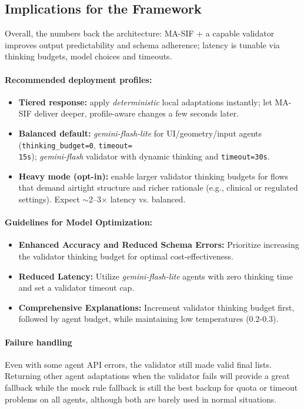 \documentclass[openany]{book}
\begin{document}
\subsection*{Implications for the Framework}
Overall, the numbers back the architecture: MA-SIF + a capable validator improves output predictability and schema adherence; latency is tunable via thinking budgets, model choices and timeouts.

\paragraph{Recommended deployment profiles:}
\begin{itemize}
    \item \textbf{Tiered response:} apply \emph{deterministic} local adaptations instantly; let MA-SIF deliver deeper, profile-aware changes a few seconds later.
    \item \textbf{Balanced default:} \emph{gemini-flash-lite} for UI/geometry/input agents (\texttt{thinking\_budget=0}, \texttt{timeout=\\15s}); \emph{gemini-flash} validator with dynamic thinking and \texttt{timeout=30s}.
    \item \textbf{Heavy mode (opt-in):} enable larger validator thinking budgets for flows that demand airtight structure and richer rationale (e.g., clinical or regulated settings). Expect $\sim$2–3$\times$ latency vs. balanced.
\end{itemize}

\paragraph{Guidelines for Model Optimization:}
\begin{itemize}
    \item \textbf{Enhanced Accuracy and Reduced Schema Errors:} Prioritize increasing the validator thinking budget for optimal cost-effectiveness.
    \item \textbf{Reduced Latency:} Utilize \emph{gemini-flash-lite} agents with zero thinking time and set a validator timeout cap.
    \item \textbf{Comprehensive Explanations:} Increment validator thinking budget first, followed by agent budget, while maintaining low temperatures (0.2-0.3).
\end{itemize}

\paragraph{Failure handling}
Even with some agent API errors, the validator still made valid final lists. Returning other agent adaptations when the validator fails will provide a great fallback while the mock rule fallback is still the best backup for quota or timeout problems on all agents, although both are barely used in normal situations.
\end{document}
